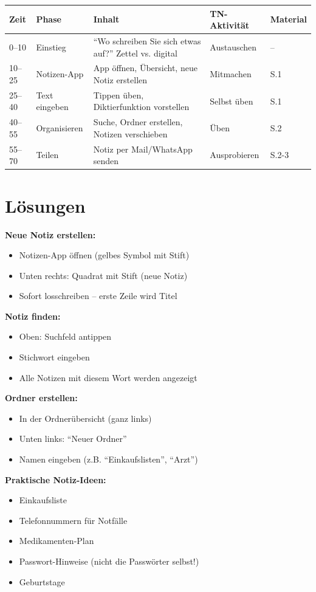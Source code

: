 \documentclass[11pt,a4paper]{article}
\begin{document}
\begin{longtable}{|p{1cm}|p{2cm}|p{5cm}|p{3cm}|p{2cm}|}
\hline
\textbf{Zeit} & \textbf{Phase} & \textbf{Inhalt} & \textbf{TN-Aktivität} & \textbf{Material} \\
\hline
0--10 & Einstieg & ``Wo schreiben Sie sich etwas auf?'' Zettel vs. digital & Austauschen & -- \\
\hline
10--25 & Notizen-App & App öffnen, Übersicht, neue Notiz erstellen & Mitmachen & S.1 \\
\hline
25--40 & Text eingeben & Tippen üben, Diktierfunktion vorstellen & Selbst üben & S.1 \\
\hline
40--55 & Organisieren & Suche, Ordner erstellen, Notizen verschieben & Üben & S.2 \\
\hline
55--70 & Teilen & Notiz per Mail/WhatsApp senden & Ausprobieren & S.2-3 \\
\hline
\end{longtable}

\section{Lösungen}

\textbf{Neue Notiz erstellen:}
\begin{itemize}
    \item Notizen-App öffnen (gelbes Symbol mit Stift)
    \item Unten rechts: Quadrat mit Stift (neue Notiz)
    \item Sofort losschreiben -- erste Zeile wird Titel
\end{itemize}

\textbf{Notiz finden:}
\begin{itemize}
    \item Oben: Suchfeld antippen
    \item Stichwort eingeben
    \item Alle Notizen mit diesem Wort werden angezeigt
\end{itemize}

\textbf{Ordner erstellen:}
\begin{itemize}
    \item In der Ordnerübersicht (ganz links)
    \item Unten links: ``Neuer Ordner''
    \item Namen eingeben (z.B. ``Einkaufslisten'', ``Arzt'')
\end{itemize}

\textbf{Praktische Notiz-Ideen:}
\begin{itemize}
    \item Einkaufsliste
    \item Telefonnummern für Notfälle
    \item Medikamenten-Plan
    \item Passwort-Hinweise (nicht die Passwörter selbst!)
    \item Geburtstage
\end{itemize}
\end{document}
